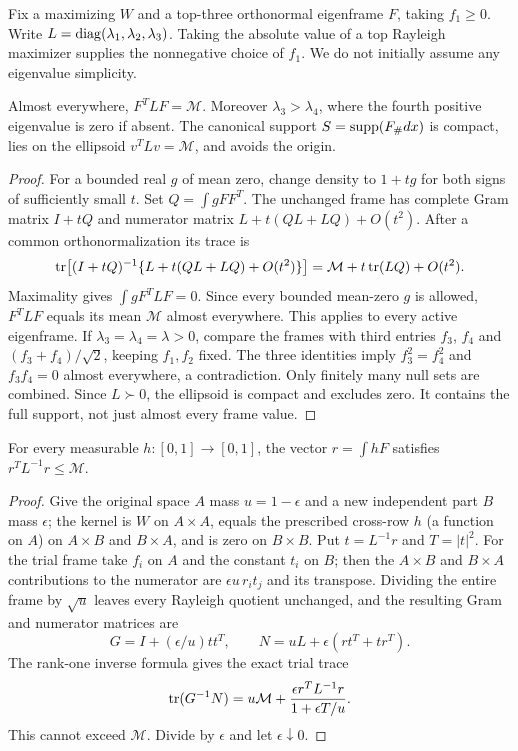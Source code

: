 Fix a maximizing $W$ and a top-three orthonormal eigenframe $F$, taking
$f_1\ge0$. Write $L=\operatorname{diag}(\lambda_1,\lambda_2,\lambda_3)$.
Taking the absolute value of a top Rayleigh maximizer supplies the
nonnegative choice of $f_1$. We do not initially assume any eigenvalue simplicity.
\begin{lemma}\label{ellipse-structure}
Almost everywhere, $F^TLF=\mathcal M$. Moreover
$\lambda_3>\lambda_4$, where the fourth positive eigenvalue is zero if
absent. The canonical support $S=\operatorname{supp}(F_\#dx)$ is compact, lies on the
ellipsoid $v^TLv=\mathcal M$, and avoids the origin.
\end{lemma}
\begin{proof}
For a bounded real $g$ of mean zero, change density to $1+tg$ for both
signs of sufficiently small $t$. Set $Q=\int gFF^T$. The unchanged frame
has complete Gram matrix $I+tQ$ and numerator matrix
$L+t(QL+LQ)+O(t^2)$. After a common orthonormalization its trace is
\[
 \operatorname{tr}\bigl[(I+tQ)^{-1}\{L+t(QL+LQ)+O(t^2)\}\bigr]
   =\mathcal M+t\operatorname{tr}(LQ)+O(t^2).
\]
Maximality gives $\int gF^TLF=0$. Since every bounded mean-zero $g$ is
allowed, $F^TLF$ equals its mean $\mathcal M$ almost everywhere.
This applies to every active eigenframe. If
$\lambda_3=\lambda_4=\lambda>0$, compare the frames with third entries
$f_3$, $f_4$ and $(f_3+f_4)/\sqrt2$, keeping $f_1,f_2$ fixed.
The three identities imply $f_3^2=f_4^2$ and $f_3f_4=0$ almost everywhere,
a contradiction. Only finitely many null sets are combined.
Since $L\succ0$, the ellipsoid is compact and excludes zero. It contains
the full support, not just almost every frame value.
\end{proof}

\begin{lemma}\label{row-insertion}
For every measurable $h:[0,1]\to[0,1]$, the vector $r=\int hF$ satisfies
$r^TL^{-1}r\le\mathcal M$.
\end{lemma}
\begin{proof}
Give the original space $A$ mass $u=1-\epsilon$ and a new independent part
$B$ mass $\epsilon$; the kernel is $W$ on $A\times A$, equals the prescribed
cross-row $h$ (a function on $A$) on $A\times B$ and $B\times A$, and is zero
on $B\times B$. Put $t=L^{-1}r$ and $T=|t|^2$. For the trial frame take $f_i$
on $A$ and the constant $t_i$ on $B$; then the $A\times B$ and $B\times A$
contributions to the numerator are $\epsilon u\,r_it_j$ and its transpose.
Dividing the entire frame by $\sqrt u$ leaves every Rayleigh quotient
unchanged, and the resulting Gram and numerator matrices are
\[
 G=I+(\epsilon/u)tt^T,\qquad
 N=uL+\epsilon(rt^T+tr^T).
\]
The rank-one inverse formula gives the exact trial trace
\[
 \operatorname{tr}(G^{-1}N)=u\mathcal M+
       \frac{\epsilon r^TL^{-1}r}{1+\epsilon T/u}.
\]
This cannot exceed $\mathcal M$. Divide by $\epsilon$ and let
$\epsilon\downarrow0$.
\end{proof}

